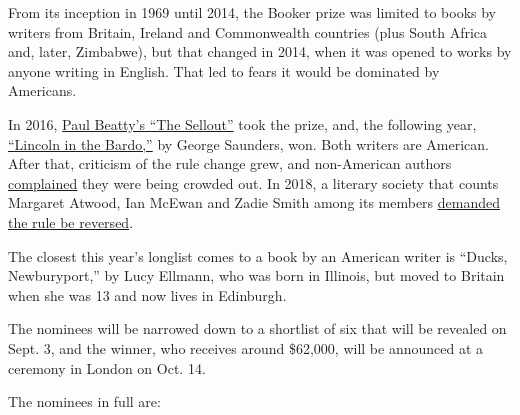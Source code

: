 From its inception in 1969 until 2014, the Booker prize was limited to
books by writers from Britain, Ireland and Commonwealth countries (plus
South Africa and, later, Zimbabwe), but that changed in 2014, when it
was opened to works by anyone writing in English. That led to fears it
would be dominated by Americans.

In 2016,
\href{https://www.nytimes.com/2016/10/26/business/media/paul-beatty-wins-man-booker-prize-with-the-sellout.html?module=inline}{Paul
Beatty's ``The Sellout''} took the prize, and, the following year,
\href{https://www.nytimes.com/2017/10/17/books/george-saunders-wins-man-booker-prize-lincoln-in-the-bardo.html?module=inline}{``Lincoln
in the Bardo,''} by George Saunders, won. Both writers are American.
After that, criticism of the rule change grew, and non-American authors
\href{https://www.nytimes.com/2018/03/30/world/europe/man-booker-prize-americans.html}{complained}
they were being crowded out. In 2018, a literary society that counts
Margaret Atwood, Ian McEwan and Zadie Smith among its members
\href{https://www.nytimes.com/2018/03/30/world/europe/man-booker-prize-americans.html?rref=collection\%2Ftimestopic\%2FMan\%20Booker\%20Prize\&action=click\&contentCollection=timestopics\&region=stream\&module=inline\&version=latest\&contentPlacement=3\&pgtype=collection}{demanded
the rule be reversed}.

The closest this year's longlist comes to a book by an American writer
is ``Ducks, Newburyport,'' by Lucy Ellmann, who was born in Illinois,
but moved to Britain when she was 13 and now lives in Edinburgh.

The nominees will be narrowed down to a shortlist of six that will be
revealed on Sept. 3, and the winner, who receives around \$62,000, will
be announced at a ceremony in London on Oct. 14.

The nominees in full are:

